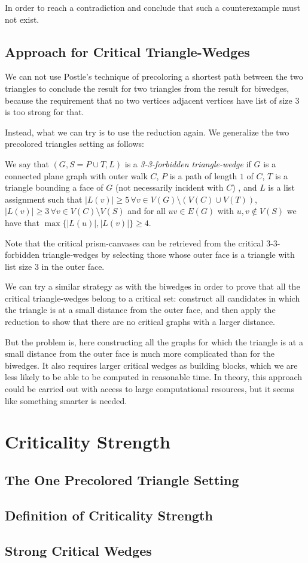 In order to reach a contradiction and conclude that such a counterexample must not exist. 

\subsection{Approach for Critical Triangle-Wedges} 

We can not use Postle's technique of precoloring a shortest path between the two
triangles to conclude the result for two triangles from the result for biwedges, because the
requirement that no two vertices adjacent vertices have list of size $3$ is too strong for
that.

Instead, what we can try is to use the reduction again. We generalize the two precolored triangles
setting as follows:

\begin{definition}
We say that $(G, S = P \cup T, L)$ is a \emph{3-3-forbidden triangle-wedge} if $G$ is a connected plane 
graph
 with outer walk $C$, $P$ is a  path of length $1$ of $C$, $T$ is a triangle bounding a face
 of $G$ (not necessarily incident with $C$)
 , and $L$ is a list assignment
  such that $|L(v)| \geq 5 \, \forall v \in V(G) \setminus (V(C) \cup V(T))$,
   $|L(v)| \geq 3 \, \forall v \in V(C) \setminus V(S)$ and for all $uv \in E(G)$ with 
   $u, v \not\in V(S)$ we have that $\max\{|L(u)|, |L(v)|\} \geq 4$. 
\end{definition}

Note that the critical prism-canvases can be retrieved from the critical 3-3-forbidden 
triangle-wedges by selecting those whose outer face is a triangle with list size $3$ in the outer
face. 

We can try a similar strategy as with the biwedges in order to prove that all the critical 
triangle-wedges belong to a critical set: construct all candidates in which the triangle is at a 
small distance from the outer face, and then apply the reduction to show that there are no critical
graphs with a larger distance.

But the problem is, here constructing all the graphs for which the triangle is at a small distance
from the outer face is much more complicated than for the biwedges.
It also requires larger critical wedges as building blocks, which we are less likely to be able to
be computed in reasonable time. In theory, this approach could be carried out with access to large
computational resources, but it seems like something smarter is needed. 

\section{Criticality Strength}

\subsection{The One Precolored Triangle Setting}

\subsection{Definition of Criticality Strength}

\subsection{Strong Critical Wedges}
